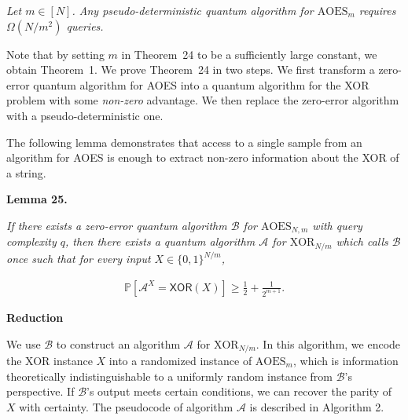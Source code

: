 \documentclass[10pt,a4paper]{article}
\begin{document}
\emph{Let $m\in[N]$. Any pseudo-deterministic quantum algorithm for ${\text{AOES}}_{m}$ requires $\Omega(N/m^{2})$ queries.}\par






Note that by setting $m$ in Theorem 24 to be a sufficiently large constant, we obtain Theorem 1.
We prove Theorem 24 in two steps. We first transform a zero-error quantum algorithm for AOES into a quantum algorithm for the XOR problem with some \emph{non-zero} advantage. We then replace the zero-error algorithm with a pseudo-deterministic one.\par




The following lemma demonstrates that access to a single sample from an algorithm for AOES is enough to extract non-zero information about the XOR of a string.\par





\par\medskip\noindent\textbf{
\textbf{Lemma 25}\textbf{.}
}\par



\emph{If there exists a zero-error quantum algorithm $\mathcal{B}$ for ${\text{AOES}}_{N,m}$ with query complexity $q$, then there exists a quantum algorithm $\mathcal{A}$ for ${\text{XOR}}_{N/m}$ which calls $\mathcal{B}$ once such that for every input $X\in\{0,1\}^{N/m}$,}\par


\[\begin{gathered}
\mathbb{P}\left[\mathcal{A}^{X}=\mathsf{XOR}(X)\right]\geq\frac{1}{2}+\frac{1}{2^{m+1}}.
\end{gathered}\]







\par\medskip\noindent\textbf{Reduction}\par




We use $\mathcal{B}$ to construct an algorithm $\mathcal{A}$ for ${\text{XOR}}_{N/m}$. In this algorithm, we encode the XOR instance $X$ into a randomized instance of ${\text{AOES}}_{m}$, which is information theoretically indistinguishable to a uniformly random instance from $\mathcal{B}$’s perspective. If $\mathcal{B}$’s output meets certain conditions, we can recover the parity of $X$ with certainty.
The pseudocode of algorithm $\mathcal{A}$ is described in Algorithm 2.\par
\end{document}
